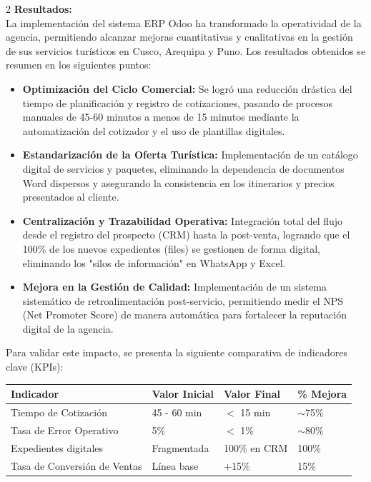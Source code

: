 \documentclass[12pt]{article}
\begin{document}
\begin{multicols}{2}
\textbf{Resultados:}\\
La implementación del sistema ERP Odoo ha transformado la operatividad de la agencia, permitiendo alcanzar mejoras cuantitativas y cualitativas en la gestión de sus servicios turísticos en Cusco, Arequipa y Puno. Los resultados obtenidos se resumen en los siguientes puntos:
\begin{itemize}
    \item \textbf{Optimización del Ciclo Comercial:} Se logró una reducción drástica del tiempo de planificación y registro de cotizaciones, pasando de procesos manuales de 45-60 minutos a menos de 15 minutos mediante la automatización del cotizador y el uso de plantillas digitales.
    \item \textbf{Estandarización de la Oferta Turística:} Implementación de un catálogo digital de servicios y paquetes, eliminando la dependencia de documentos Word dispersos y asegurando la consistencia en los itinerarios y precios presentados al cliente.
    \item \textbf{Centralización y Trazabilidad Operativa:} Integración total del flujo desde el registro del prospecto (CRM) hasta la post-venta, logrando que el 100\% de los nuevos expedientes (files) se gestionen de forma digital, eliminando los "silos de información" en WhatsApp y Excel.
    \item \textbf{Mejora en la Gestión de Calidad:} Implementación de un sistema sistemático de retroalimentación post-servicio, permitiendo medir el NPS (Net Promoter Score) de manera automática para fortalecer la reputación digital de la agencia.
\end{itemize}

Para validar este impacto, se presenta la siguiente comparativa de indicadores clave (KPIs):
\vspace{0.2cm}
\begin{center}
\scriptsize
\renewcommand{\arraystretch}{1.15}
\setlength{\tabcolsep}{3pt}
\begin{tabular}{|p{1.85cm}|p{1.65cm}|p{1.45cm}|p{1.15cm}|}
\hline
\textbf{Indicador} & \centering\textbf{Valor Inicial} & \centering\textbf{Valor Final} & \centering\textbf{\% Mejora}\tabularnewline \hline
Tiempo de Cotización & 45 - 60 min & $<$ 15 min & $\sim$75\% \\ \hline
Tasa de Error Operativo & 5\% & $<$ 1\% & $\sim$80\% \\ \hline
Expedientes digitales & Fragmentada & 100\% en CRM & 100\% \\ \hline
Tasa de Conversión de Ventas & Línea base & +15\% & 15\% \\ \hline
\end{tabular}
\normalsize
\end{center}


\end{multicols}
\end{document}
